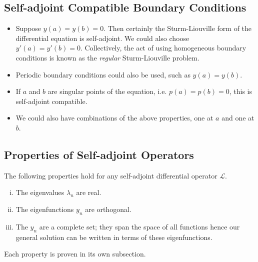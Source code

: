 \subsection{Self-adjoint Compatible Boundary Conditions}
\begin{itemize}
	\item Suppose \( y(a) = y(b) = 0 \).
	      Then certainly the Sturm-Liouville form of the differential equation is self-adjoint.
	      We could also choose \( y'(a) = y'(b) = 0 \).
	      Collectively, the act of using homogeneous boundary conditions is known as the \textit{regular} Sturm-Liouville problem.
	\item Periodic boundary conditions could also be used, such as \( y(a) = y(b) \).
	\item If \( a \) and \( b \) are singular points of the equation, i.e.
	      \( p(a) = p(b) = 0 \), this is self-adjoint compatible.
	\item We could also have combinations of the above properties, one at \( a \) and one at \( b \).
\end{itemize}

\subsection{Properties of Self-adjoint Operators}
The following properties hold for any self-adjoint differential operator \( \mathcal L \).
\begin{enumerate}[(i)]
	\item The eigenvalues \( \lambda_n \) are real.
	\item The eigenfunctions \( y_n \) are orthogonal.
	\item The \( y_n \) are a complete set; they span the space of all functions hence our general solution can be written in terms of these eigenfunctions.
\end{enumerate}
Each property is proven in its own subsection.

